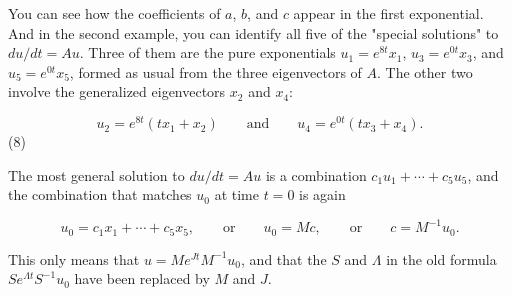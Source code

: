 You can see how the coefficients of \(a\), \(b\), and \(c\) appear in the first exponential. And in the second example, you can identify all five of the "special solutions" to \(du/dt=Au\). Three of them are the pure exponentials \(u_{1}=e^{8t}x_{1}\), \(u_{3}=e^{0t}x_{3}\), and \(u_{5}=e^{0t}x_{5}\), formed as usual from the three eigenvectors of \(A\). The other two involve the generalized eigenvectors \(x_{2}\) and \(x_{4}\):

\[u_{2}=e^{8t}(tx_{1}+x_{2})\qquad\text{and}\qquad u_{4}=e^{0t}(tx_{3}+x_{4}).\] (8)

The most general solution to \(du/dt=Au\) is a combination \(c_{1}u_{1}+\cdots+c_{5}u_{5}\), and the combination that matches \(u_{0}\) at time \(t=0\) is again

\[u_{0}=c_{1}x_{1}+\cdots+c_{5}x_{5},\qquad\text{or}\qquad u_{0}=Mc,\qquad\text {or}\qquad c=M^{-1}u_{0}.\]

This only means that \(u=Me^{Jt}M^{-1}u_{0}\), and that the \(S\) and \(\Lambda\) in the old formula \(Se^{\Lambda t}S^{-1}u_{0}\) have been replaced by \(M\) and \(J\).

 